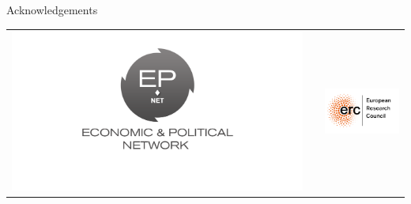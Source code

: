 \documentclass[final]{beamer}
\newlength{\onecolwid}
\begin{document}
\begin{frame}[t]
\begin{columns}[t]
\begin{column}{\onecolwid}
\begin{block}{Acknowledgements}
\end{block}




\begin{center}
\begin{tabular}{ccc}
\includegraphics[width=0.52\linewidth]{images/epnet.png} & \hfill & \includegraphics[width=0.5\linewidth]{images/erc.png}
\end{tabular}
\end{center}


\end{column} %

\end{columns} %

\end{frame} %
\end{document}
